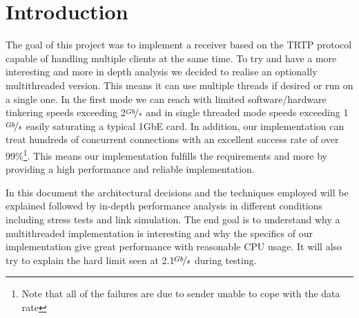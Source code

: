 \documentclass[../main.tex]{subfiles}
\begin{document}
\section{Introduction}

The goal of this project was to implement a receiver based on the TRTP protocol capable of handling multiple clients at the same time. 
To try and have a more interesting and more in depth analysis we decided to realise an optionally multithreaded version. This means it 
can use multiple threads if desired or run on a single one. In the first mode we can reach with limited software/hardware tinkering speeds 
exceeding 2$\nicefrac{Gb}{s}$ and in single threaded mode speeds exceeding 1$\nicefrac{Gb}{s}$ easily saturating a typical 1GbE card. In 
addition, our implementation can treat hundreds of concurrent connections with an excellent success rate of over 99\%\footnote{Note that 
all of the failures are due to sender unable to cope with the data rate}. This means our implementation fulfills the requirements and 
more by providing a high performance and reliable implementation.

In this document the architectural decisions and the techniques employed will be explained followed by in-depth performance analysis 
in different conditions including stress tests and link simulation. The end goal is to understand why a multithreaded implementation 
is interesting and why the specifics of our implementation give great performance with reasonable CPU usage. It will also try to explain
 the hard limit seen at 2.1$\nicefrac{Gb}{s}$ during testing.
\end{document}
